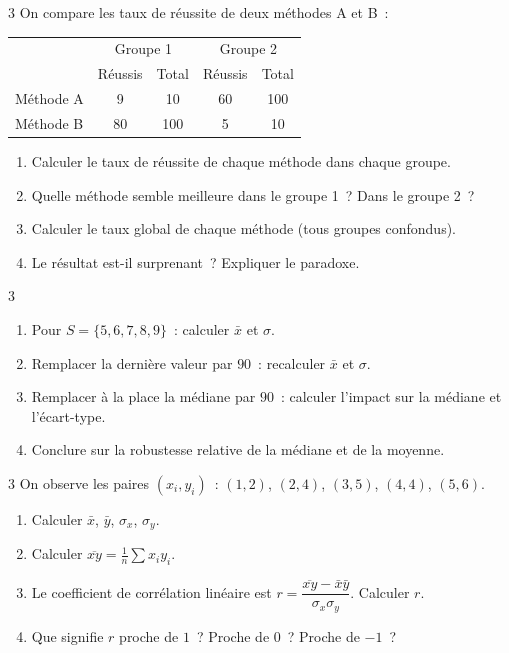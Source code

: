 \begin{exo}{3}
On compare les taux de r\'eussite de deux m\'ethodes A et B~:
\begin{center}
\begin{tabular}{|l|cc|cc|}
\hline
\rowcolor{BN!10} & \multicolumn{2}{c|}{Groupe 1} & \multicolumn{2}{c|}{Groupe 2} \\
\rowcolor{BN!10} & R\'eussis & Total & R\'eussis & Total \\
\hline
M\'ethode A & 9 & 10 & 60 & 100 \\
M\'ethode B & 80 & 100 & 5 & 10 \\
\hline
\end{tabular}
\end{center}
\begin{enumerate}
  \item Calculer le taux de r\'eussite de chaque m\'ethode dans chaque groupe.
  \item Quelle m\'ethode semble meilleure dans le groupe 1~? Dans le groupe 2~?
  \item Calculer le taux global de chaque m\'ethode (tous groupes confondus).
  \item Le r\'esultat est-il surprenant~? Expliquer le paradoxe.
\end{enumerate}
\end{exo}

\begin{exo}{3}
\begin{enumerate}
  \item Pour $S = \{5, 6, 7, 8, 9\}$~: calculer $\bar{x}$ et $\sigma$.
  \item Remplacer la derni\`ere valeur par $90$~:
        recalculer $\bar{x}$ et $\sigma$.
  \item Remplacer \`a la place la m\'ediane par $90$~:
        calculer l'impact sur la m\'ediane et l'\'ecart-type.
  \item Conclure sur la robustesse relative de la m\'ediane et de la moyenne.
\end{enumerate}
\end{exo}

\begin{exo}{3}
On observe les paires $(x_i, y_i)$~:
$(1,2)$, $(2,4)$, $(3,5)$, $(4,4)$, $(5,6)$.
\begin{enumerate}
  \item Calculer $\bar{x}$, $\bar{y}$, $\sigma_x$, $\sigma_y$.
  \item Calculer $\overline{xy} = \frac{1}{n}\sum x_i y_i$.
  \item Le coefficient de corr\'elation lin\'eaire est
        $r = \dfrac{\overline{xy}-\bar{x}\bar{y}}{\sigma_x\sigma_y}$.
        Calculer $r$.
  \item Que signifie $r$ proche de $1$~? Proche de $0$~? Proche de $-1$~?
\end{enumerate}
\end{exo}

